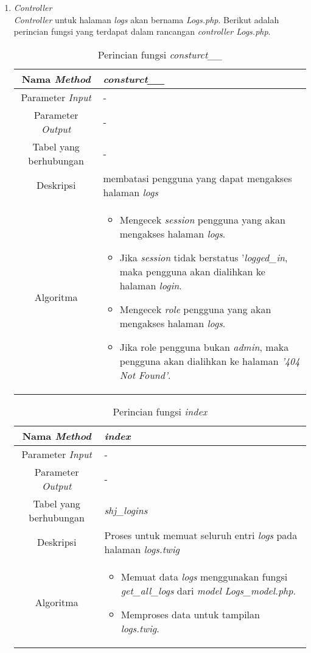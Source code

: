 \begin{enumerate}
	\item \textit{Controller} \\
	\textit{Controller} untuk halaman \textit{logs} akan bernama \textit{Logs.php}. Berikut adalah perincian fungsi yang terdapat dalam rancangan \textit{controller Logs.php}.
	\begin{table}[H]
		\caption{Perincian fungsi \textit{consturct\_\_}}
		\begin{tabular}{|c|p{11cm}|}
			\hline
			Nama \textit{Method} 	& 	\textit{consturct\_\_} 	\\
			\hline
			Parameter \textit{Input} & - \\
			\hline
			Parameter \textit{Output} &  - \\
			\hline
			Tabel yang berhubungan & - \\
			\hline
			Deskripsi	& membatasi pengguna yang dapat mengakses halaman \textit{logs}	 \\
			\hline
			Algoritma	& \begin{itemize}
				\item Mengecek \textit{session} pengguna yang akan mengakses halaman \textit{logs}.
				\item Jika \textit{session} tidak berstatus '\textit{logged\_in}, maka pengguna akan dialihkan ke halaman \textit{login}.
				\item Mengecek \textit{role} pengguna yang akan mengakses halaman \textit{logs}.
				\item Jika role pengguna bukan \textit{admin}, maka pengguna akan dialihkan ke halaman \textit{'404 Not Found'}.
			\end{itemize} \\
			\hline
		\end{tabular}
	\end{table}
	
	\begin{table}[H]
		\caption{Perincian fungsi \textit{index}}
		\begin{tabular}{|c|p{11cm}|}
			\hline
			Nama \textit{Method} 	& 	\textit{index} 	\\
			\hline
			Parameter \textit{Input} & - \\
			\hline
			Parameter \textit{Output} &  - \\
			\hline
			Tabel yang berhubungan & \textit{shj\_logins} \\
			\hline
			Deskripsi	& Proses untuk memuat seluruh entri \textit{logs} pada halaman \textit{logs.twig}	 \\
			\hline
			Algoritma	& \begin{itemize}
				\item Memuat data \textit{logs} menggunakan fungsi \textit{get\_all\_logs} dari \textit{model Logs\_model.php}.
				\item Memproses data untuk tampilan \textit{logs.twig}.
			\end{itemize} \\
			\hline
		\end{tabular}
	\end{table}
\end{enumerate}

